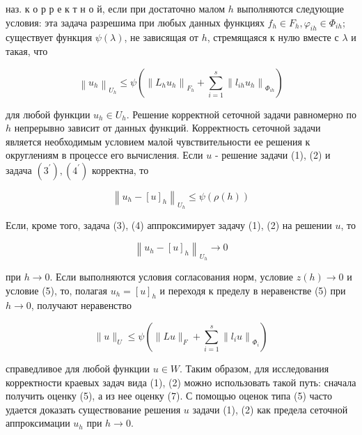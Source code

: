 \documentclass[10pt]{article}
\begin{document}
наз. к о р р е к т н о й, если при достаточно малом $h$ выполняются следующие условия: эта задача разрешима при любых данных функциях $f_{h} \in F_{h}, \varphi_{i h} \in \Phi_{i h}$; существует функция $\psi(\lambda)$, не зависящая от $h$, стремящаяся к нулю вместе с $\lambda$ и такая, что



\[

\left\|u_{h}\right\|_{U_{h}} \leqslant \psi\left(\left\|L_{h} u_{h}\right\|_{F_{h}}+\sum_{i=1}^{s}\left\|l_{i h} u_{h}\right\|_{\Phi_{i h}}\right)

\]



для любой функции $u_{h} \in U_{h}$. Решение корректной сеточной задачи равномерно по $h$ непрерывно зависит от данных функций. Корректность сеточной задачи является необходимым условием малой чувствительности ее решения к округлениям в процессе его вычисления. Если $u$ - решение задачи (1), (2) и задача $\left(3^{\prime}\right),\left(4^{\prime}\right)$ корректна, то



\[

\left\|u_{h}-[u]_{h}\right\|_{U_{h}} \leqslant \psi(\rho(h))

\]



Если, кроме того, задача (3), (4) аппроксимирует задачу (1), (2) на решении $u$, то



\[

\left\|u_{h}-[u]_{h}\right\|_{U_{h}} \longrightarrow 0

\]



при $h \rightarrow 0$. Если выполняются условия согласования норм, условие $z(h) \rightarrow 0$ и условие (5), то, полагая $u_{h}=[u]_{h}$ и переходя к пределу в неравенстве (5) при $h \rightarrow 0$, получают неравенство



\[

\|u\|_{U} \leqslant \psi\left(\|L u\|_{F}+\sum_{i=1}^{s}\left\|l_{i} u\right\|_{\Phi_{i}}\right)

\]



справедливое для любой функции $u \in W$. Таким образом, для исследования корректности краевых задач вида (1), (2) можно использовать такой путь: сначала получить оценку (5), а из нее оценку (7). С помощью оценок типа (5) часто удается доказать существование решения $u$ задачи (1), (2) как предела сеточной аппроксимации $u_{h}$ при $h \rightarrow 0$.
\end{document}
